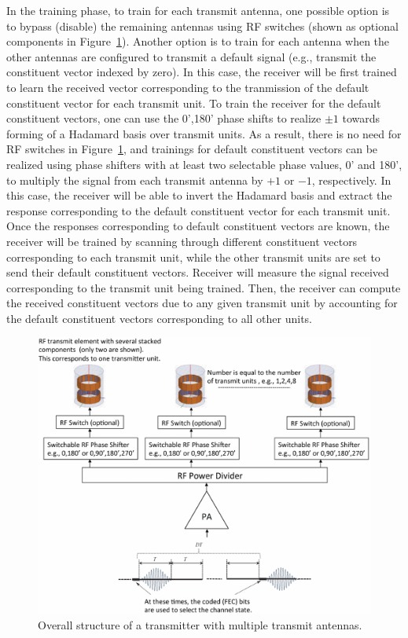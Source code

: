 In the training phase, to train for each transmit antenna, one possible option is to bypass (disable)
the remaining antennas using RF switches (shown as optional components in Figure~\ref{single_rf_chain}).
Another option is to train for each antenna when the other antennas are configured to transmit a default signal (e.g., transmit the constituent vector indexed by zero). In this case, the receiver will be first trained to learn the received vector corresponding to the tranmission of the default constituent vector for each transmit unit. To train the receiver for the default constituent vectors, one can use the 0',180' phase shifts to realize $\pm 1$ towards forming of a Hadamard basis over transmit units. As a result, there is no need for RF switches in Figure~\ref{single_rf_chain}, and trainings for default constituent vectors can be realized using phase shifters with at least two selectable phase values, 0' and 180', to multiply the signal from each transmit antenna by $+1$ or $-1$, respectively. In this case, the receiver will be able to invert the Hadamard basis and extract the response corresponding to the default constituent vector for each transmit unit.
Once the responses corresponding to default constituent vectors are known, the receiver will be trained by scanning through different constituent vectors corresponding to each transmit unit, while the other transmit units are set to send their default constituent vectors. Receiver will measure the signal received corresponding to the transmit unit being trained. Then, the receiver can compute the received constituent vectors due to any given transmit unit by accounting for the default constituent vectors corresponding to all other units.
 
\vspace{2cm}
\begin{figure}[t]
\hspace{-1cm}
\vspace{-0.2cm}
\includegraphics[scale = 0.68, trim = -3.5cm -1cm 2cm 0cm]{./fig/rf_chain4-1.pdf}
\caption{Overall structure of a transmitter with multiple transmit antennas.}
\label{single_rf_chain}
\end{figure}


